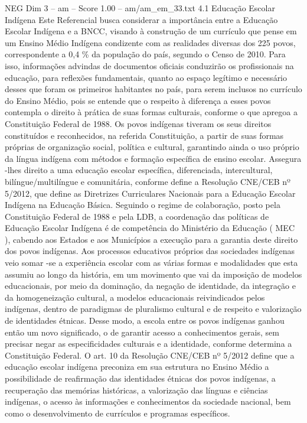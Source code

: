 \begin{textsample}{NEG Dim 3 – am – Score 1.00 – am/am\_em\_33.txt}  \label{ex:f3_neg_254}
4.1 Educação Escolar Indígena Este Referencial busca considerar a importância entre a Educação Escolar Indígena e a BNCC, visando à construção de um currículo que pense em um Ensino Médio Indígena condizente com as realidades diversas dos 225 povos, correspondente a 0,4 \% da população do país, segundo o Censo de 2010.
Para isso, informações advindas de documentos oficiais conduzirão os profissionais na educação, para reflexões fundamentais, quanto ao espaço legítimo e necessário desses que foram os primeiros habitantes no país, para serem inclusos no currículo do Ensino Médio, pois se entende que o respeito à diferença a esses povos contempla o direito à prática de suas formas culturais, conforme o que apregoa a Constituição Federal de 1988.
Os povos indígenas tiveram os seus direitos constituídos e reconhecidos, na referida Constituição, a partir de suas formas próprias de organização social, política e cultural, garantindo ainda o uso próprio da língua indígena com métodos e formação específica de ensino escolar.
Assegura -lhes direito a uma educação escolar específica, diferenciada, intercultural, bilíngue/multilíngue e comunitária, conforme define a Resolução CNE/CEB nº 5/2012, que define as Diretrizes Curriculares Nacionais para a Educação Escolar Indígena na Educação Básica.
Seguindo o regime de colaboração, posto pela Constituição Federal de 1988 e pela LDB, a coordenação das políticas de Educação Escolar Indígena é de competência do Ministério da Educação ( MEC ), cabendo aos Estados e aos Municípios a execução para a garantia deste direito dos povos indígenas.
Aos processos educativos próprios das sociedades indígenas veio somar -se a experiência escolar com as várias formas e modalidades que esta assumiu ao longo da história, em um movimento que vai da imposição de modelos educacionais, por meio da dominação, da negação de identidade, da integração e da homogeneização cultural, a modelos educacionais reivindicados pelos indígenas, dentro de paradigmas de pluralismo cultural e de respeito e valorização de identidades étnicas.
Desse modo, a escola entre os povos indígenas ganhou então um novo significado, o de garantir acesso a conhecimentos gerais, sem precisar negar as especificidades culturais e a identidade, conforme determina a Constituição Federal.
O art. 10 da Resolução CNE/CEB nº 5/2012 define que a educação escolar indígena preconiza em sua estrutura no Ensino Médio a possibilidade de reafirmação das identidades étnicas dos povos indígenas, a recuperação das memórias históricas, a valorização das línguas e ciências indígenas, o acesso às informações e conhecimentos da sociedade nacional, bem como o desenvolvimento de currículos e programas específicos.

\end{textsample}
